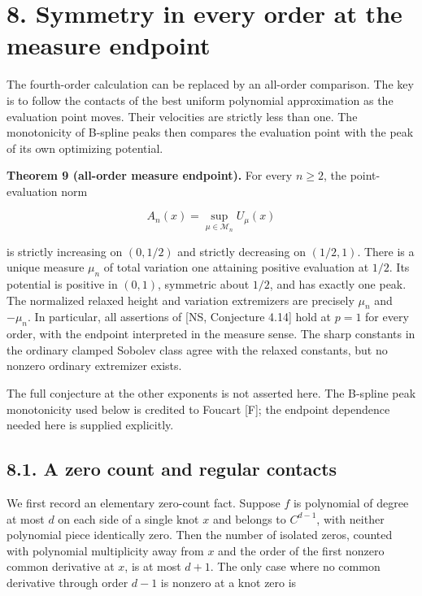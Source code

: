 \documentclass[11pt]{article}
\begin{document}
\section{8. Symmetry in every order at the measure
endpoint}\label{symmetry-in-every-order-at-the-measure-endpoint}

The fourth-order calculation can be replaced by an all-order comparison.
The key is to follow the contacts of the best uniform polynomial
approximation as the evaluation point moves. Their velocities are
strictly less than one. The monotonicity of B-spline peaks then compares
the evaluation point with the peak of its own optimizing potential.

\textbf{Theorem 9 (all-order measure endpoint).} For every \(n\ge2\),
the point-evaluation norm

\[
A_n(x)=\sup_{\mu\in\mathcal M_n}U_\mu(x)
\]

is strictly increasing on \((0,1/2)\) and strictly decreasing on
\((1/2,1)\). There is a unique measure \(\mu_n\) of total variation one
attaining positive evaluation at \(1/2\). Its potential is positive in
\((0,1)\), symmetric about \(1/2\), and has exactly one peak. The
normalized relaxed height and variation extremizers are precisely
\(\mu_n\) and \(-\mu_n\). In particular, all assertions of {[}NS,
Conjecture 4.14{]} hold at \(p=1\) for every order, with the endpoint
interpreted in the measure sense. The sharp constants in the ordinary
clamped Sobolev class agree with the relaxed constants, but no nonzero
ordinary extremizer exists.

The full conjecture at the other exponents is not asserted here. The
B-spline peak monotonicity used below is credited to Foucart {[}F{]};
the endpoint dependence needed here is supplied explicitly.

\subsection{8.1. A zero count and regular
contacts}\label{a-zero-count-and-regular-contacts}

We first record an elementary zero-count fact. Suppose \(f\) is
polynomial of degree at most \(d\) on each side of a single knot \(x\)
and belongs to \(C^{d-1}\), with neither polynomial piece identically
zero. Then the number of isolated zeros, counted with polynomial
multiplicity away from \(x\) and the order of the first nonzero common
derivative at \(x\), is at most \(d+1\). The only case where no common
derivative through order \(d-1\) is nonzero at a knot zero is
\end{document}
